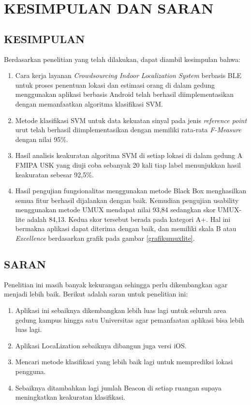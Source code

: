 \fancyhf{}
\fancyfoot[C]{\thepage}
\chapter{KESIMPULAN DAN SARAN}

\section{\uppercase{KESIMPULAN}}
Berdasarkan penelitian yang telah dilakukan, dapat diambil kesimpulan bahwa:
\begin{enumerate}
	\item Cara kerja layanan \textit{Crowdsourcing Indoor Localization System} berbasis BLE untuk proses penentuan lokasi dan estimasi orang di dalam gedung menggunakan aplikasi berbasis Android telah berhasil diimplementasikan dengan memanfaatkan algoritma klasifikasi SVM.
	\item Metode klasifikasi SVM untuk data kekuatan sinyal pada jenis \textit{reference point} urut telah berhasil diimplementasikan dengan memiliki rata-rata \textit{F-Measure} dengan nilai 95\%.
	\item Hasil analisis keakuratan algoritma SVM di setiap lokasi di dalam gedung A FMIPA USK yang diuji coba sebanyak 20 kali tiap label menunjukkan hasil keakuratan sebesar 92,5\%.
	\item Hasil pengujian fungsionalitas menggunakan metode Black Box menghasilkan semua fitur berhasil dijalankan dengan baik. Kemudian pengujian usability menggunakan metode UMUX mendapat nilai 93,84 sedangkan skor UMUX-lite adalah 84,13. Kedua skor tersebut berada pada kategori A+. Hal ini bermakna aplikasi dapat diterima dengan baik, dan memiliki skala B atau \textit{Excellence} berdasarkan grafik pada gambar \ref{grafikumuxlite}.
\end{enumerate}



\section{\uppercase{SARAN}}

Penelitian ini masih banyak kekurangan sehingga perlu dikembangkan agar menjadi lebih baik. Berikut adalah saran untuk penelitian ini:
\begin{enumerate}
	\item Aplikasi ini sebaiknya dikembangkan lebih luas lagi untuk seluruh area gedung kampus hingga satu Universitas agar pemanfaatan aplikasi bisa lebih luas lagi.
	\item Aplikasi LocaLization sebaiknya dibangun juga  versi iOS.
	\item Mencari metode klasifikasi yang lebih baik lagi untuk memprediksi lokasi pengguna.
	\item Sebaiknya ditambahkan lagi jumlah Beacon di setiap ruangan supaya meningkatkan keakuratan klasifikasi.

\end{enumerate}

\fancyhf{}
\fancyfoot[R]{\thepage}
\begin{comment}

\end{comment}

